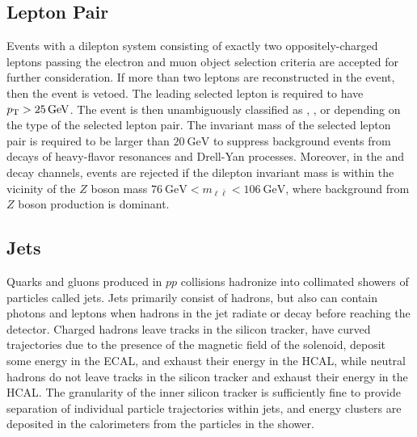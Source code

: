 \subsection{Lepton Pair}
Events with a dilepton system consisting of exactly two oppositely-charged leptons passing the electron and muon object selection criteria are accepted for further consideration.
If more than two leptons are reconstructed in the event, then the event is vetoed.
The leading selected lepton is required to have $\pT > \SI{25}{\GeV}$.
The event is then unambiguously classified as \ee, \emu, or \mumu depending on the type of the selected lepton pair.
The invariant mass of the selected lepton pair is required to be larger than $\SI{20}{\GeV}$ to suppress background events from decays of heavy-flavor resonances and Drell-Yan processes.
Moreover, in the \ee and \mumu decay channels, events are rejected if the dilepton invariant mass is within the vicinity of the $Z$ boson mass $\SI{76}{\GeV} < m_{\ell\bar{\ell}} < \SI{106}{\GeV}$, where background from $Z$ boson production is dominant.

\subsection{Jets}
\label{PF_Reconstruction_Jets}
Quarks and gluons produced in $pp$ collisions hadronize into collimated showers of particles called jets.
Jets primarily consist of hadrons, but also can contain photons and leptons when hadrons in the jet radiate or decay before reaching the detector.
Charged hadrons leave tracks in the silicon tracker, have curved trajectories due to the presence of the magnetic field of the solenoid, deposit some energy in the ECAL, and exhaust their energy in the HCAL, while neutral hadrons do not leave tracks in the silicon tracker and exhaust their energy in the HCAL.
The granularity of the inner silicon tracker is sufficiently fine to provide separation of individual particle trajectories within jets, and energy clusters are deposited in the calorimeters from the particles in the shower.

